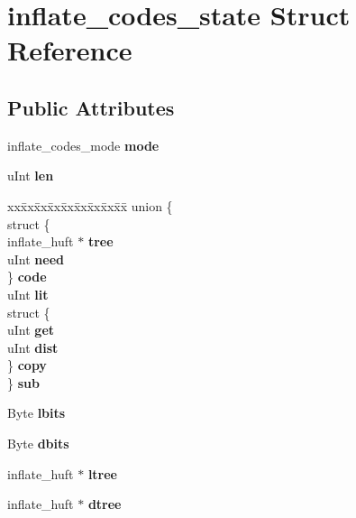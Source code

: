 \hypertarget{structinflate__codes__state}{}\section{inflate\+\_\+codes\+\_\+state Struct Reference}
\label{structinflate__codes__state}
\subsection*{Public Attributes}
\begin{DoxyCompactItemize}
\item 
\mbox{\label{structinflate__codes__state_a3e49c20a3b136773bc284f8663b2ff3e}} 
inflate\+\_\+codes\+\_\+mode {\bfseries mode}
\item 
\mbox{\label{structinflate__codes__state_a587855c033e7a4d2bae6db2d063911d1}} 
u\+Int {\bfseries len}
\item 
\mbox{\label{structinflate__codes__state_a8fc6d6261d1741d5cacc914d461e533c}} 
\begin{tabbing}
xx\=xx\=xx\=xx\=xx\=xx\=xx\=xx\=xx\=\kill
union \{\\
\>struct \{\\
\>\>inflate\_huft $\ast$ {\bfseries tree}\\
\>\>uInt {\bfseries need}\\
\>\} {\bfseries code}\\
\>uInt {\bfseries lit}\\
\>struct \{\\
\>\>uInt {\bfseries get}\\
\>\>uInt {\bfseries dist}\\
\>\} {\bfseries copy}\\
\} {\bfseries sub}\\

\end{tabbing}\item 
\mbox{\label{structinflate__codes__state_a3962907dadd1f3ff9bcaae5810676c14}} 
Byte {\bfseries lbits}
\item 
\mbox{\label{structinflate__codes__state_a31889987198fbd60c57005306adabb46}} 
Byte {\bfseries dbits}
\item 
\mbox{\label{structinflate__codes__state_abf443b09dacdf4061524b0556c3932dd}} 
inflate\+\_\+huft $\ast$ {\bfseries ltree}
\item 
\mbox{\label{structinflate__codes__state_ac0b2b7ff52166b8facf9e2551a14ee46}} 
inflate\+\_\+huft $\ast$ {\bfseries dtree}
\end{DoxyCompactItemize}


